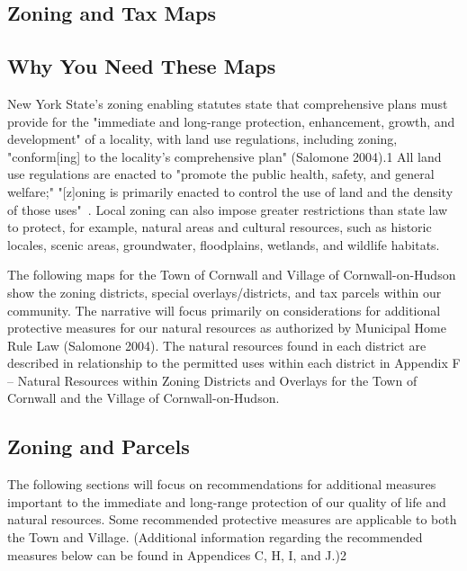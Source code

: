 \label{map:protectedopenspace}
\subsection{Zoning and Tax Maps}\label{subsec:zoning}
\subsection*{Why You Need These Maps}
New York State's zoning enabling statutes state that comprehensive plans must 
provide for the "immediate and long-range protection, enhancement, growth, and 
development" of a locality, with land use regulations, including zoning, 
"conform[ing] to the locality's comprehensive plan" (Salomone 2004).1 All land 
use regulations are enacted to "promote the public health, safety, and general 
welfare;" "[z]oning is primarily enacted to control the use of land and the 
density of those uses"~\citep{haeckel2014}.  Local zoning can also impose 
greater restrictions than state law to protect, for example, natural areas and 
cultural resources, such as historic locales, scenic areas, groundwater, 
floodplains, wetlands, and wildlife habitats.

The following maps for the Town of Cornwall and Village of Cornwall-on-Hudson 
show the zoning districts, special overlays/districts, and tax parcels within 
our community. The narrative will focus primarily on considerations for 
additional protective measures for our natural resources as authorized by 
Municipal Home Rule Law (Salomone 2004). The natural resources found in each 
district are described in relationship to the permitted uses within each 
district in Appendix F – Natural Resources within Zoning Districts and Overlays 
for the Town of Cornwall and the Village of Cornwall-on-Hudson.

\subsection*{Zoning and Parcels}
The following sections will focus on recommendations for additional measures 
important to the immediate and long-range protection of our quality of life and 
natural resources. Some recommended protective measures are applicable to both 
the Town and Village. (Additional information regarding the recommended 
measures below can be found in Appendices C, H, I, and J.)2

